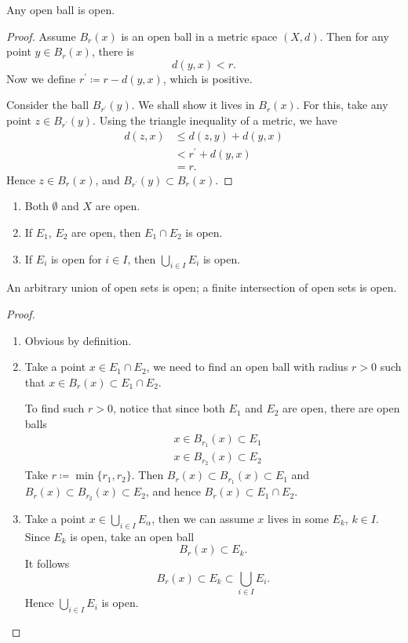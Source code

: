 \begin{proposition}
Any open ball is open.
\end{proposition}

\begin{proof}
Assume $B_r(x)$ is an open ball in a metric space $(X,d)$. Then for any point $y\in B_r(x)$, there is
\[ d(y,x)<r. \]
Now we define $r^\prime\coloneqq r-d(y,x)$, which is positive.

Consider the ball $B_{r^\prime}(y)$. We shall show it lives in $B_r(x)$. For this, take any point $z\in B_{r^\prime}(y)$. Using the triangle inequality of a metric, we have
\begin{align*}
d(z,x)&\le d(z,y)+d(y,x)\\
&<r^\prime+d(y,x)\\
&=r.
\end{align*}
Hence $z\in B_r(x)$, and $B_{r^\prime}(y)\subset B_r(x)$.
\end{proof}

\begin{proposition}
\begin{enumerate}[label=(\arabic*)]
\item Both $\emptyset$ and $X$ are open.
\item If $E_1$, $E_2$ are open, then $E_1\cap E_2$ is open.
\item If $E_i$ is open for $i\in I$, then $\bigcup_{i\in I}E_i$ is open.
\end{enumerate}
\end{proposition}

An arbitrary union of open sets is open; a finite intersection of open sets is open.

\begin{proof} \
\begin{enumerate}[label=(\arabic*)]
\item Obvious by definition.
\item Take a point $x\in E_1\cap E_2$, we need to find an open ball with radius $r>0$ such that $x\in B_r(x)\subset E_1\cap E_2$.

To find such $r>0$, notice that since both $E_1$ and $E_2$ are open, there are open balls
\begin{align*}
&x\in B_{r_1}(x)\subset E_1\\
&x\in B_{r_2}(x)\subset E_2
\end{align*}
Take $r\coloneqq\min\{r_1,r_2\}$. Then $B_r(x)\subset B_{r_1}(x)\subset E_1$ and $B_r(x)\subset B_{r_2}(x)\subset E_2$, and hence $B_r(x)\subset E_1\cap E_2$.

\item Take a point $x\in\bigcup_{i\in I}E_\alpha$, then we can assume $x$ lives in some $E_k$, $k\in I$. Since $E_k$ is open, take an open ball 
\[B_r(x)\subset E_k.\]
It follows
\[B_r(x)\subset E_k\subset\bigcup_{i\in I}E_i.\]
Hence $\bigcup_{i\in I}E_i$ is open.
\end{enumerate}
\end{proof}

